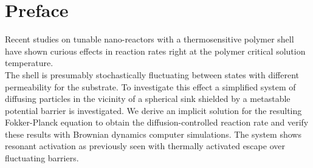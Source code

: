 \section{Preface}
Recent studies on tunable nano-reactors with a thermosensitive polymer shell have shown curious effects in reaction rates right at the polymer critical solution temperature. \\
The shell is presumably stochastically fluctuating between states with different permeability for the substrate.
To investigate this effect a simplified system of diffusing particles in the vicinity of a spherical sink shielded by a metastable potential barrier is investigated. We derive an implicit solution for the resulting Fokker-Planck equation to obtain the diffusion-controlled reaction rate and verify these results with Brownian dynamics computer simulations. The system shows resonant activation as previously seen with thermally activated escape over fluctuating barriers.

\tableofcontents
\newpage
